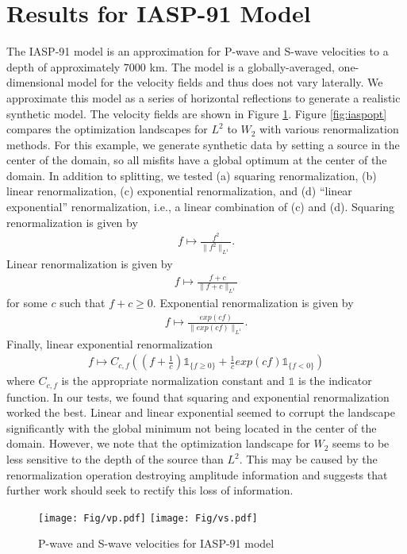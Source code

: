 \section{Results for IASP-91 Model}
The IASP-91 model is an approximation for P-wave and S-wave velocities to a depth of approximately $7000$ km. The model is a globally-averaged, one-dimensional model for the velocity fields and thus does not vary laterally. We approximate this model as a series of horizontal reflections to generate a realistic synthetic model. The velocity fields are shown in Figure \ref{fig:iaspvel}. Figure \ref{fig:iaspopt} compares the optimization landscapes for $L^2$ to $W_2$ with various renormalization methods. For this example, we generate synthetic data by setting a source in the center of the domain, so all misfits have a global optimum at the center of the domain. In addition to splitting, we tested (a) squaring renormalization, (b) linear renormalization, (c) exponential renormalization, and (d) ``linear exponential'' renormalization, i.e., a linear combination of (c) and (d). Squaring renormalization is given by
\begin{align} \label{eqn:square}
f \mapsto \frac{f^2}{\|f^2\|_{L^1}}.
\end{align}
Linear renormalization is given by
\begin{align} \label{eqn:linear}
f \mapsto \frac{f+c}{\|f+c\|_{L^1}}
\end{align}
for some $c$ such that $f + c \geq 0$.
Exponential renormalization is given by
\begin{align} \label{eqn:exponential}
f \mapsto \frac{exp(c f)}{\|exp(c f)\|_{L^1}}.
\end{align}
Finally, linear exponential renormalization
\begin{align} \label{eqn:linexp}
f \mapsto C_{c,f} \left( (f+\frac{1}{c})\mathds{1}_{\{f \geq 0\}} + \frac{1}{c} exp(c f) \mathds{1}_{\{f < 0\}}\right)
\end{align}
where $C_{c,f}$ is the appropriate normalization constant and $\mathds{1}$ is the indicator function. In our tests, we found that squaring and exponential renormalization worked the best. Linear and linear exponential seemed to corrupt the landscape significantly with the global minimum not being located in the center of the domain. However, we note that the optimization landscape for $W_2$ seems to be less sensitive to the depth of the source than $L^2$. This may be caused by the renormalization operation destroying amplitude information and suggests that further work should seek to rectify this loss of information.
\begin{figure}
\texttt{[image: Fig/vp.pdf]}
\texttt{[image: Fig/vs.pdf]}
\caption{P-wave and S-wave velocities for IASP-91 model}
\label{fig:iaspvel}
\end{figure}

